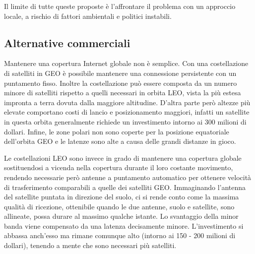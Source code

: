 \documentclass[12pt,a4paper,oneside]{book}
\begin{document}
\begin{itemize}
			\end{itemize}
			
			Il limite di tutte queste proposte è l'affrontare il problema con un approccio locale, a rischio di fattori ambientali e politici instabili. 
		
		\subsection{Alternative commerciali}
		Mantenere una copertura Internet globale non è semplice. Con una costellazione di satelliti in GEO è possibile mantenere una connessione persistente con un puntamento fisso. Inoltre la costellazione può essere composta da un numero minore di satelliti rispetto a quelli necessari in orbita LEO, vista la più estesa impronta a terra dovuta dalla maggiore altitudine.
		D'altra parte però altezze più elevate comportano costi di lancio e posizionamento maggiori, infatti un satellite in questa orbita generalmente richiede un investimento intorno ai 300 milioni di dollari. Infine, le zone polari non sono coperte per la posizione equatoriale dell'orbita GEO e le latenze sono alte a causa delle grandi distanze in gioco.
		
		Le costellazioni LEO sono invece in grado di mantenere una copertura globale sostituendosi a vicenda nella copertura durante il loro costante movimento, rendendo necessarie però antenne a puntamento automatico per ottenere velocità di trasferimento comparabili a quelle dei satelliti GEO. Immaginando l'antenna del satellite puntata in direzione del suolo, ci si rende conto come la massima qualità di ricezione, ottenibile quando le due antenne, suolo e satellite, sono allineate, possa durare al massimo qualche istante. Lo svantaggio della minor banda viene compensato da una latenza decisamente minore. L'investimento si abbassa anch'esso ma rimane comunque alto (intorno ai 150 - 200 milioni di dollari), tenendo a mente che sono necessari più satelliti.
		
\end{document}
